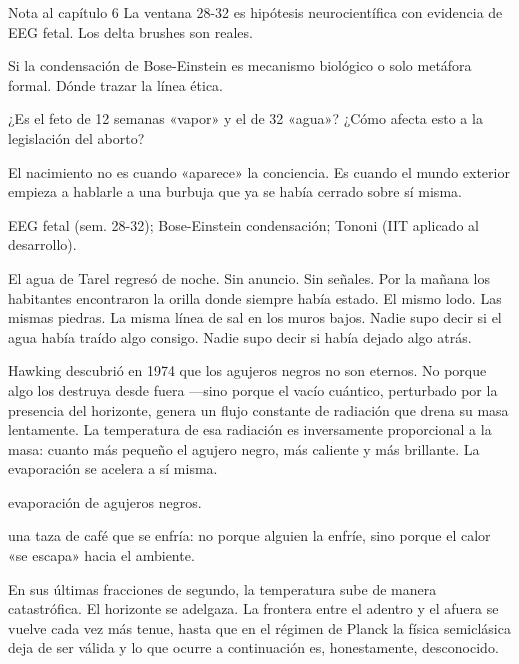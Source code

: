 \begin{notacap}{Nota al capítulo 6}
 La ventana 28-32 es hipótesis neurocientífica con evidencia de EEG fetal. Los delta brushes son reales.

 Si la condensación de Bose-Einstein es mecanismo biológico o solo metáfora formal. Dónde trazar la línea ética.

 ¿Es el feto de 12 semanas «vapor» y el de 32 «agua»? ¿Cómo afecta esto a la legislación del aborto?

 El nacimiento no es cuando «aparece» la conciencia. Es cuando el mundo exterior empieza a hablarle a una burbuja que ya se había cerrado sobre sí misma.

 EEG fetal (sem. 28-32); Bose-Einstein condensación; Tononi (IIT aplicado al desarrollo).
\end{notacap}
\begin{cita}
El agua de Tarel regresó de noche. Sin anuncio. Sin señales. Por la mañana los habitantes encontraron la orilla donde siempre había estado. El mismo lodo. Las mismas piedras. La misma línea de sal en los muros bajos. Nadie supo decir si el agua había traído algo consigo. Nadie supo decir si había dejado algo atrás.
\end{cita}
\noindent {} Hawking descubrió en 1974 que los agujeros negros no son eternos. No porque algo los destruya desde fuera —sino porque el vacío cuántico, perturbado por la presencia del horizonte, genera un flujo constante de radiación que drena su masa lentamente. La temperatura de esa radiación es inversamente proporcional a la masa: cuanto más pequeño el agujero negro, más caliente y más brillante. La evaporación se acelera a sí misma.

\begin{fisica}
 evaporación de agujeros negros.

 una taza de café que se enfría: no porque alguien la enfríe, sino porque el calor «se escapa» hacia el ambiente.
\end{fisica}
En sus últimas fracciones de segundo, la temperatura sube de manera catastrófica. El horizonte se adelgaza. La frontera entre el adentro y el afuera se vuelve cada vez más tenue, hasta que en el régimen de Planck la física semiclásica deja de ser válida y lo que ocurre a continuación es, honestamente, desconocido.

